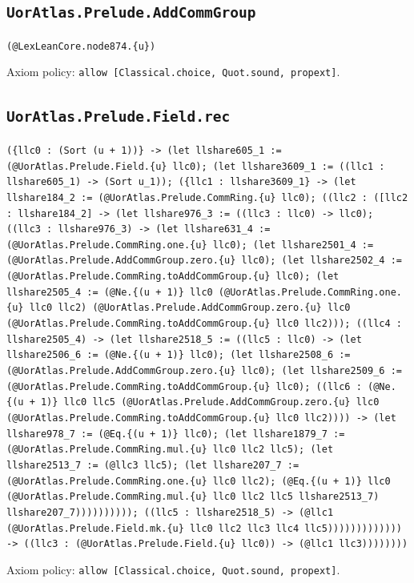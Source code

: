 \documentclass[11pt]{article}
\begin{document}
\subsection*{\texttt{UorAtlas.Prelude.AddCommGroup}}
\noindent\texttt{(@LexLeanCore.node874.\{u\})}\par
\noindent Axiom policy: \texttt{allow [Classical.choice, Quot.sound, propext]}.\par
\subsection*{\texttt{UorAtlas.Prelude.Field.rec}}
\noindent\texttt{(\{llc0 : (Sort (u + 1))\} -> (let llshare605\_1 := (@UorAtlas.Prelude.Field.\{u\} llc0); (let llshare3609\_1 := ((llc1 : llshare605\_1) -> (Sort u\_1)); (\{llc1 : llshare3609\_1\} -> (let llshare184\_2 := (@UorAtlas.Prelude.CommRing.\{u\} llc0); ((llc2 : ([llc2 : llshare184\_2] -> (let llshare976\_3 := ((llc3 : llc0) -> llc0); ((llc3 : llshare976\_3) -> (let llshare631\_4 := (@UorAtlas.Prelude.CommRing.one.\{u\} llc0); (let llshare2501\_4 := (@UorAtlas.Prelude.AddCommGroup.zero.\{u\} llc0); (let llshare2502\_4 := (@UorAtlas.Prelude.CommRing.toAddCommGroup.\{u\} llc0); (let llshare2505\_4 := (@Ne.\{(u + 1)\} llc0 (@UorAtlas.Prelude.CommRing.one.\{u\} llc0 llc2) (@UorAtlas.Prelude.AddCommGroup.zero.\{u\} llc0 (@UorAtlas.Prelude.CommRing.toAddCommGroup.\{u\} llc0 llc2))); ((llc4 : llshare2505\_4) -> (let llshare2518\_5 := ((llc5 : llc0) -> (let llshare2506\_6 := (@Ne.\{(u + 1)\} llc0); (let llshare2508\_6 := (@UorAtlas.Prelude.AddCommGroup.zero.\{u\} llc0); (let llshare2509\_6 := (@UorAtlas.Prelude.CommRing.toAddCommGroup.\{u\} llc0); ((llc6 : (@Ne.\{(u + 1)\} llc0 llc5 (@UorAtlas.Prelude.AddCommGroup.zero.\{u\} llc0 (@UorAtlas.Prelude.CommRing.toAddCommGroup.\{u\} llc0 llc2)))) -> (let llshare978\_7 := (@Eq.\{(u + 1)\} llc0); (let llshare1879\_7 := (@UorAtlas.Prelude.CommRing.mul.\{u\} llc0 llc2 llc5); (let llshare2513\_7 := (@llc3 llc5); (let llshare207\_7 := (@UorAtlas.Prelude.CommRing.one.\{u\} llc0 llc2); (@Eq.\{(u + 1)\} llc0 (@UorAtlas.Prelude.CommRing.mul.\{u\} llc0 llc2 llc5 llshare2513\_7) llshare207\_7)))))))))); ((llc5 : llshare2518\_5) -> (@llc1 (@UorAtlas.Prelude.Field.mk.\{u\} llc0 llc2 llc3 llc4 llc5))))))))))))) -> ((llc3 : (@UorAtlas.Prelude.Field.\{u\} llc0)) -> (@llc1 llc3))))))))}\par
\noindent Axiom policy: \texttt{allow [Classical.choice, Quot.sound, propext]}.\par
\end{document}
